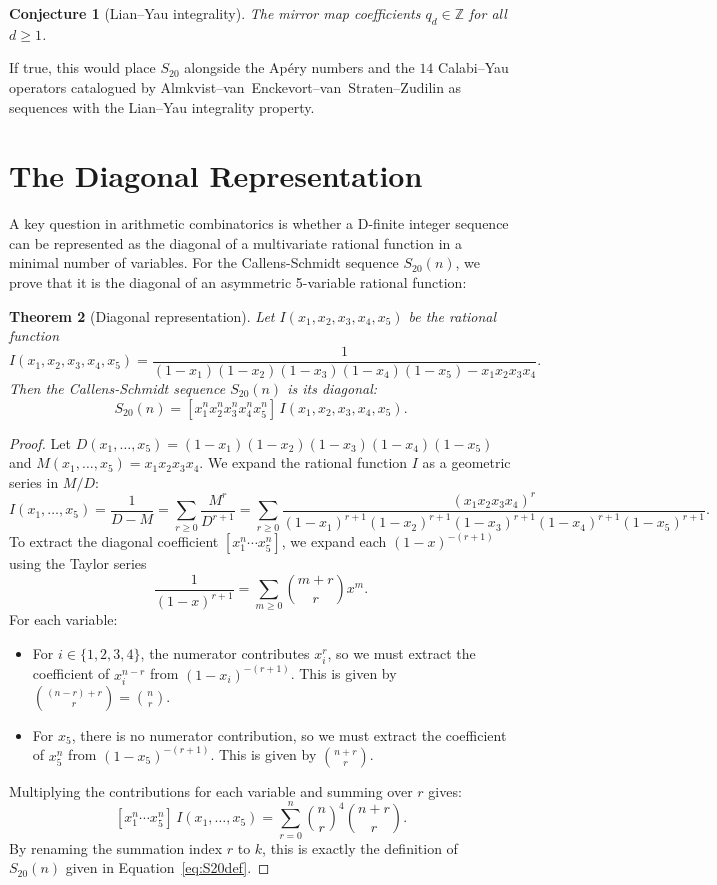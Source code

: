 \documentclass[12pt,reqno]{amsart}
\theoremstyle{plain}
\newtheorem{theorem}{Theorem}[section]
\newtheorem{conjecture}[theorem]{Conjecture}
\theoremstyle{definition}
\theoremstyle{remark}
\newcommand{\ZZ}{\mathbb{Z}}
\begin{document}
\begin{conjecture}[Lian--Yau integrality]\label{conj:LY}
The mirror map coefficients $q_d \in \ZZ$ for \emph{all} $d \ge 1$.
\end{conjecture}

If true, this would place $S_{20}$ alongside the Ap\'ery numbers
and the $14$ Calabi--Yau operators catalogued by
Almkvist--van~Enckevort--van~Straten--Zudilin as sequences with
the Lian--Yau integrality property.


\section{The Diagonal Representation}\label{sec:diagonal}

A key question in arithmetic combinatorics is whether a D-finite integer sequence can be represented as the diagonal of a multivariate rational function in a minimal number of variables. For the Callens-Schmidt sequence $S_{20}(n)$, we prove that it is the diagonal of an asymmetric 5-variable rational function:

\begin{theorem}[Diagonal representation]\label{thm:diagonal}
Let $I(x_1, x_2, x_3, x_4, x_5)$ be the rational function
\[
I(x_1, x_2, x_3, x_4, x_5) = \frac{1}{(1-x_1)(1-x_2)(1-x_3)(1-x_4)(1-x_5) - x_1 x_2 x_3 x_4}.
\]
Then the Callens-Schmidt sequence $S_{20}(n)$ is its diagonal:
\[
S_{20}(n) = [x_1^n x_2^n x_3^n x_4^n x_5^n]\, I(x_1, x_2, x_3, x_4, x_5).
\]
\end{theorem}

\begin{proof}
Let $D(x_1, \ldots, x_5) = (1-x_1)(1-x_2)(1-x_3)(1-x_4)(1-x_5)$ and $M(x_1, \ldots, x_5) = x_1 x_2 x_3 x_4$.
We expand the rational function $I$ as a geometric series in $M/D$:
\[
I(x_1, \ldots, x_5) = \frac{1}{D - M} = \sum_{r \ge 0} \frac{M^r}{D^{r+1}} = \sum_{r \ge 0} \frac{(x_1 x_2 x_3 x_4)^r}{(1-x_1)^{r+1} (1-x_2)^{r+1} (1-x_3)^{r+1} (1-x_4)^{r+1} (1-x_5)^{r+1}}.
\]
To extract the diagonal coefficient $[x_1^n \cdots x_5^n]$, we expand each $(1-x)^{-(r+1)}$ using the Taylor series
\[
\frac{1}{(1-x)^{r+1}} = \sum_{m \ge 0} \binom{m+r}{r} x^m.
\]
For each variable:
\begin{itemize}
\item For $i \in \{1, 2, 3, 4\}$, the numerator contributes $x_i^r$, so we must extract the coefficient of $x_i^{n-r}$ from $(1-x_i)^{-(r+1)}$. This is given by $\binom{(n-r)+r}{r} = \binom{n}{r}$.
\item For $x_5$, there is no numerator contribution, so we must extract the coefficient of $x_5^n$ from $(1-x_5)^{-(r+1)}$. This is given by $\binom{n+r}{r}$.
\end{itemize}
Multiplying the contributions for each variable and summing over $r$ gives:
\[
[x_1^n \cdots x_5^n]\, I(x_1, \ldots, x_5) = \sum_{r=0}^n \binom{n}{r}^{\!4} \binom{n+r}{r}.
\]
By renaming the summation index $r$ to $k$, this is exactly the definition of $S_{20}(n)$ given in Equation~\eqref{eq:S20def}.
\end{proof}
\end{document}
